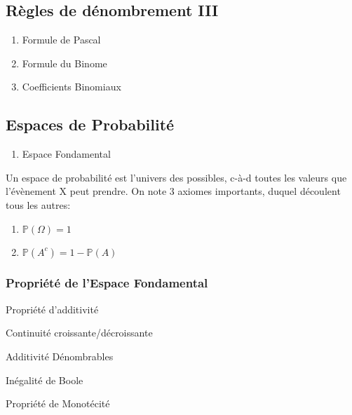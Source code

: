 \documentclass{article}
\begin{document}
\begin{problem}
\end{problem}

\subsection{Règles de dénombrement III}

\begin{enumerate}
    \item Formule de Pascal
    \item Formule du Binome
    \item Coefficients Binomiaux
\end{enumerate}

\subsection{Espaces de Probabilité}

\begin{enumerate}
    \item Espace Fondamental
\end{enumerate}

Un espace de probabilité est l'univers des possibles, c-à-d toutes les
valeurs que l'évènement X peut prendre. On note 3 axiomes importants, duquel
découlent tous les autres:

\begin{enumerate}
    \item $ \mathbb{P} (\Omega) = 1 $
    \item $ \mathbb{P} (A^c) = 1  - \mathbb{P}(A)$
\end{enumerate}

\subsubsection{Propriété de l'Espace Fondamental}%
\label{ssub:Propriété de l'Espace Fondamental}


\begin{property}
    \item Propriété d'additivité
    \item Continuité croissante/décroissante
    \item Additivité Dénombrables
    \item Inégalité de Boole
    \item Propriété de Monotécité
\end{property}
\end{document}
